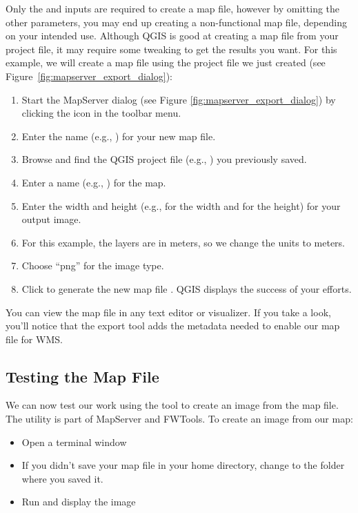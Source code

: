 Only the  and  inputs are 
required to create a map file, however by omitting the other parameters, 
you may end up creating a non-functional map file, depending on your intended use. 
Although QGIS is good at creating a map file from your project file, 
it may require some tweaking to get the results you want. 
For this example, we will create a map file using the project file 
 we just created 
(see Figure~\ref{fig:mapserver_export_dialog}):

\begin{enumerate}
  \item  Start the MapServer dialog (see 
Figure \ref{fig:mapserver_export_dialog}) by clicking the  icon in the toolbar menu.
  \item Enter the name (e.g., ) for your new map file.
  \item Browse and find the QGIS project file (e.g., ) 
  you previously saved.
  \item Enter a name (e.g., ) for the map.
  \item Enter the width and height (e.g.,  for the width and  for the height) for your output image.
  \item For this example, the layers are in meters, so we change the units to meters.
  \item Choose ``png'' for the image type.
  \item Click  to generate the new map file . 
  QGIS displays the success of your efforts.
\end{enumerate}

You can view the map file in any text editor or visualizer. If you
take a look, you'll notice that the export tool adds the metadata needed
to enable our map file for WMS. 

\subsection{Testing the Map File}

We can now test our work using the  tool to create an image
from the map file. The  utility is part of MapServer and FWTools. 
To create an image from our map:

\begin{itemize}[label=--]
\item Open a terminal window
\item If you didn't save your map file in your home directory, change to
  the folder where you saved it.
\item Run  and 
  display the image 
\end{itemize}
 
